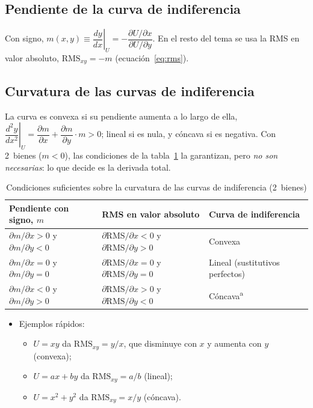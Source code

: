 \documentclass[11pt]{article}
\begin{document}
\subsection{Pendiente de la curva de indiferencia}\label{anexo:pendiente-curva-indiferencia}

Con signo, $m(x,y)\equiv\left.\dfrac{dy}{dx}\right|_{U}=-\dfrac{\partial U/\partial x}{\partial U/\partial y}$. En el resto del tema se usa la RMS en valor absoluto, $\mathrm{RMS}_{xy}=-m$ (ecuación~\eqref{eq:rms}).

\subsection{Curvatura de las curvas de indiferencia}\label{anexo:curvatura-curvas-indiferencia}

La curva es convexa si su pendiente aumenta a lo largo de ella, $\left.\dfrac{d^2y}{dx^2}\right|_{U}=\dfrac{\partial m}{\partial x}+\dfrac{\partial m}{\partial y}\cdot m>0$; lineal si es nula, y cóncava si es negativa. Con 2~bienes ($m<0$), las condiciones de la tabla~\ref{tab:curvatura} la garantizan, pero \emph{no son necesarias}: lo que decide es la derivada total.
\begin{table}[H]
\centering\small
\caption{Condiciones suficientes sobre la curvatura de las curvas de indiferencia (2~bienes)}\label{tab:curvatura}
\begin{tabular}{@{}lll@{}}
\toprule
\textbf{Pendiente con signo, $m$} & \textbf{RMS en valor absoluto} & \textbf{Curva de indiferencia} \\
\midrule
$\partial m/\partial x>0$ y $\partial m/\partial y<0$ & $\partial\mathrm{RMS}/\partial x<0$ y $\partial\mathrm{RMS}/\partial y>0$ & Convexa \\
$\partial m/\partial x=0$ y $\partial m/\partial y=0$ & $\partial\mathrm{RMS}/\partial x=0$ y $\partial\mathrm{RMS}/\partial y=0$ & Lineal (sustitutivos perfectos) \\
$\partial m/\partial x<0$ y $\partial m/\partial y>0$ & $\partial\mathrm{RMS}/\partial x>0$ y $\partial\mathrm{RMS}/\partial y<0$ & Cóncava\textsuperscript{a} \\
\bottomrule
\end{tabular}
\par{}
\end{table}

\begin{itemize}
\item Ejemplos rápidos:
  \begin{itemize}
  \item $U=xy$ da $\mathrm{RMS}_{xy}=y/x$, que disminuye con $x$ y aumenta con $y$ (convexa);
  \item $U=ax+by$ da $\mathrm{RMS}_{xy}=a/b$ (lineal);
  \item $U=x^2+y^2$ da $\mathrm{RMS}_{xy}=x/y$ (cóncava).
  \end{itemize}
\end{itemize}

\bibliografia
\end{document}
